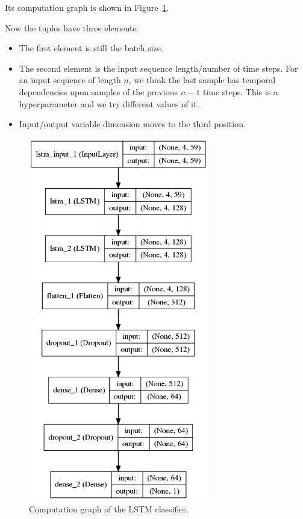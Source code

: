 \documentclass[11pt,a4paper]{report}
\begin{document}
Its computation graph is shown in Figure~\ref{fig:lstm}.

Now the tuples have three elements:

\begin{itemize}
  \item The first element is still the batch size.
  \item The second element is the input sequence length/number of time steps.
    For an input sequence of length \(n\), we think the last sample has temporal dependencies upon samples of the previous \(n-1\) time steps.
    This is a hyperparameter and we try different values of it.
  \item Input/output variable dimension moves to the third position.
\end{itemize}

\begin{figure}[htbp]
  \centering
  \includegraphics[width=0.7\textwidth]{model-lstm.png}
  \caption{Computation graph of the LSTM classifier.} \label{fig:lstm}
\end{figure}
\end{document}
